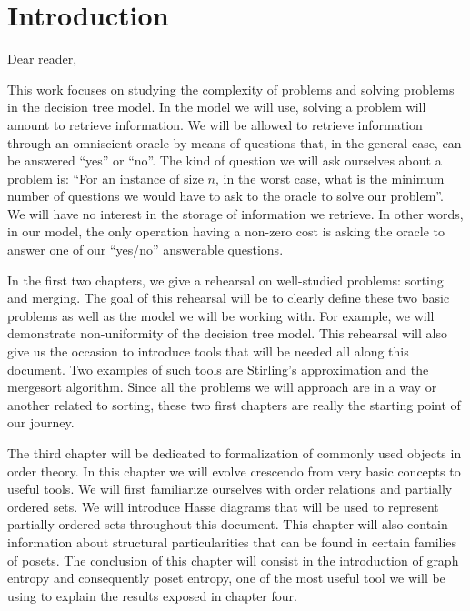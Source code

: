 \setcounter{chapter}{-1}
\chapter{Introduction}

Dear reader,

This work focuses on studying the complexity of problems and solving problems
in the decision tree model. In the model we will use, solving a problem will
amount to retrieve information. We will be allowed to retrieve information
through an omniscient oracle by means of questions that, in the general case,
can be answered ``yes'' or ``no''. The kind of question we will ask ourselves
about a problem is: ``For an instance of size \(n\), in the worst case, what is
the minimum number of questions we would have to ask to the oracle to solve our
problem''. We will have no interest in the storage of information we retrieve.
In other words, in our model, the only operation having a non-zero cost is
asking the oracle to answer one of our ``yes/no'' answerable questions.

In the first two chapters, we give a rehearsal on well-studied problems:
sorting and merging. The goal of this rehearsal will be to clearly define these
two basic problems as well as the model we will be working with. For example,
we will demonstrate non-uniformity of the decision tree model. This rehearsal
will also give us the occasion to introduce tools that will be needed all along
this document. Two examples of such tools are Stirling's approximation and the
mergesort algorithm.  Since all the problems we will approach are in a way or
another related to sorting, these two first chapters are really the starting
point of our journey.

The third chapter will be dedicated to formalization of commonly used objects
in order theory. In this chapter we will evolve crescendo from very basic
concepts to useful tools. We will first familiarize ourselves with order
relations and partially ordered sets. We will introduce Hasse diagrams that
will be used to represent partially ordered sets throughout this document.
This chapter will also contain information about structural particularities
that can be found in certain families of posets. The conclusion of this
chapter will consist in the introduction of graph entropy and consequently
poset entropy, one of the most useful tool we will be using to explain the
results exposed in chapter four.

